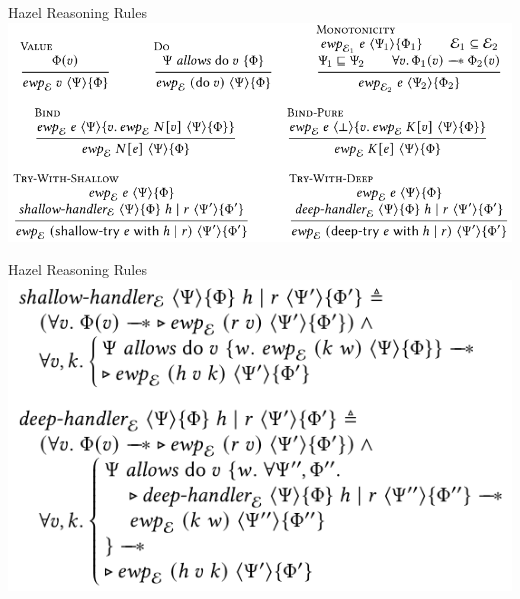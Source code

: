 \documentclass[aspectratio=43]{beamer}
\newcommand{\ocaml}[1]{\texttt{#1}}
\begin{document}
\begin{frame}{Hazel Reasoning Rules}
    \includegraphics[width=\textwidth]{reasoning_rules1.png}
\end{frame}

\begin{frame}{Hazel Reasoning Rules}
    \includegraphics[width=\textwidth]{reasoning_rules2.png}
\end{frame}

\end{document}

